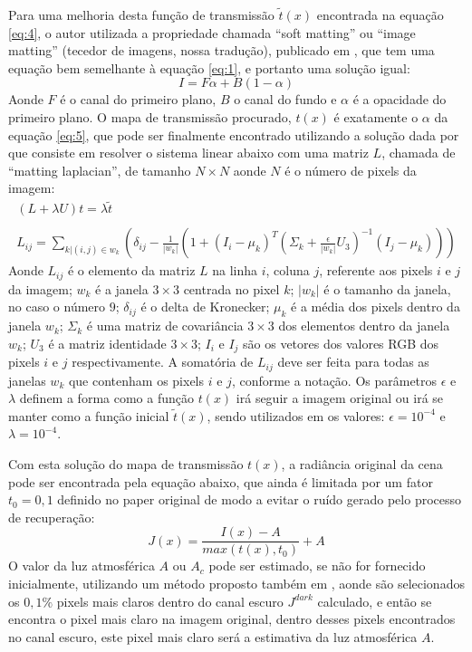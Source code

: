 \documentclass[12pt,openany, oneside,
 article, 
 a4paper, hyphens, english, brazil]{abntex2}
\begin{document}
Para uma melhoria desta função de transmissão $\tilde{t}(x)$ encontrada na equação \ref{eq:4}, o autor utilizada a propriedade chamada ``soft matting'' ou ``image matting'' (tecedor de imagens, nossa tradução), publicado em \cite{matting}, que tem uma equação bem semelhante à equação \ref{eq:1}, e portanto uma solução igual:
\begin{equation}\label{eq:5}
I = F\alpha + B(1-\alpha)
\end{equation}
Aonde $F$ é o canal do primeiro plano, $B$ o canal do fundo e $\alpha$ é a opacidade do primeiro plano. O mapa de transmissão procurado, $t(x)$ é exatamente o $\alpha$ da equação \ref{eq:5}, que pode ser finalmente encontrado utilizando a solução dada por \cite{matting} que consiste em resolver o sistema linear abaixo com uma matriz $L$, chamada de ``matting laplacian'', de tamanho $N \times N$ aonde $N$ é o número de pixels da imagem:
\begin{equation}
\begin{gathered}
(L + \lambda U)t = \lambda \tilde{t}\\
\\
L_{ij} = \displaystyle \sum_{k | (i,j) \in w_k} \left( \delta_{ij} - \frac{1}{|w_k|} \left( 1 + (I_i - \mu_k)^T (\Sigma_k + \frac{\epsilon}{|w_k|}U_3)^{-1}(I_j - \mu_k) \right) \right)
\end{gathered}
\end{equation}
Aonde $L_{ij}$ é o elemento da matriz $L$ na linha $i$, coluna $j$, referente aos pixels $i$ e $j$ da imagem; $w_k$ é a janela $3 \times 3$ centrada no pixel $k$; $|w_k|$ é o tamanho da janela, no caso o número $9$; $\delta_{ij}$ é o delta de Kronecker; $\mu_k$ é a média dos pixels dentro da janela $w_k$; $\Sigma_k$ é uma matriz de covariância $3\times3$ dos elementos dentro da janela $w_k$; $U_3$ é a matriz identidade $3\times3$; $I_i$ e $I_j$ são os vetores dos valores RGB dos pixels $i$ e $j$ respectivamente. A somatória de $L_{ij}$ deve ser feita para todas as janelas $w_k$ que contenham os pixels $i$ e $j$, conforme a notação. Os parâmetros $\epsilon$ e $\lambda$ definem a forma como a função $t(x)$ irá seguir a imagem original ou irá se manter como a função inicial $\tilde{t}(x)$, sendo utilizados em \cite{HazeRemoval} os valores: $\epsilon=10^{-4}$ e $\lambda=10^{-4}$.

Com esta solução do mapa de transmissão $t(x)$, a radiância original da cena pode ser encontrada pela equação abaixo, que ainda é limitada por um fator $t_0 = 0,1$ definido no paper original de modo a evitar o ruído gerado pelo processo de recuperação:
\begin{equation}
J(x) = \frac{I(x)-A}{max(t(x), t_0)} + A
\end{equation}
O valor da luz atmosférica $A$ ou $A_c$ pode ser estimado, se não for fornecido inicialmente, utilizando um método proposto também em \cite{matting}, aonde são selecionados os $0,1\%$ pixels mais claros dentro do canal escuro $J^{dark}$ calculado, e então se encontra o pixel mais claro na imagem original, dentro desses pixels encontrados no canal escuro, este pixel mais claro será a estimativa da luz atmosférica $A$.
\end{document}
